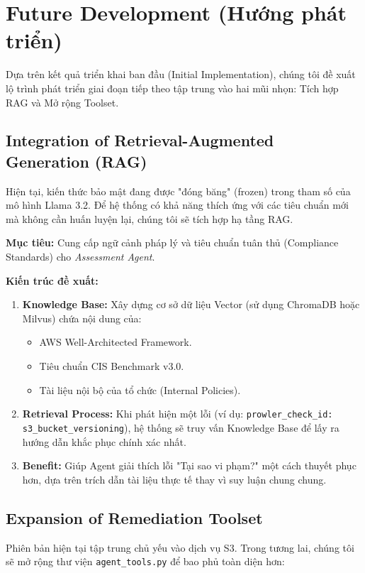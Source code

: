 \section{Future Development (Hướng phát triển)}

Dựa trên kết quả triển khai ban đầu (Initial Implementation), chúng tôi đề xuất lộ trình phát triển giai đoạn tiếp theo tập trung vào hai mũi nhọn: Tích hợp RAG và Mở rộng Toolset.

\subsection{Integration of Retrieval-Augmented Generation (RAG)}
Hiện tại, kiến thức bảo mật đang được "đóng băng" (frozen) trong tham số của mô hình Llama 3.2. Để hệ thống có khả năng thích ứng với các tiêu chuẩn mới mà không cần huấn luyện lại, chúng tôi sẽ tích hợp hạ tầng RAG.

\textbf{Mục tiêu:}
Cung cấp ngữ cảnh pháp lý và tiêu chuẩn tuân thủ (Compliance Standards) cho \textit{Assessment Agent}.

\textbf{Kiến trúc đề xuất:}
\begin{enumerate}
    \item \textbf{Knowledge Base:} Xây dựng cơ sở dữ liệu Vector (sử dụng ChromaDB hoặc Milvus) chứa nội dung của:
    \begin{itemize}
        \item AWS Well-Architected Framework.
        \item Tiêu chuẩn CIS Benchmark v3.0.
        \item Tài liệu nội bộ của tổ chức (Internal Policies).
    \end{itemize}
    \item \textbf{Retrieval Process:} Khi phát hiện một lỗi (ví dụ: \texttt{prowler\_check\_id: s3\_bucket\_versioning}), hệ thống sẽ truy vấn Knowledge Base để lấy ra hướng dẫn khắc phục chính xác nhất.
    \item \textbf{Benefit:} Giúp Agent giải thích lỗi "Tại sao vi phạm?" một cách thuyết phục hơn, dựa trên trích dẫn tài liệu thực tế thay vì suy luận chung chung.
\end{enumerate}

\subsection{Expansion of Remediation Toolset}
Phiên bản hiện tại tập trung chủ yếu vào dịch vụ S3. Trong tương lai, chúng tôi sẽ mở rộng thư viện \texttt{agent\_tools.py} để bao phủ toàn diện hơn:

